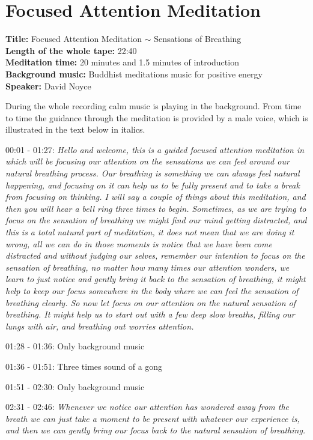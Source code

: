 \chapter{Focused Attention Meditation}
\textbf{Title:} Focused Attention Meditation $\sim$  Sensations of Breathing  \\
\textbf{Length of the whole tape:} 22:40 \\
\textbf{Meditation time:} 20 minutes and 1.5 minutes of introduction \\
\textbf{Background music:} Buddhist meditations music for positive energy  \\
\textbf{Speaker:} David Noyce 

During the whole recording calm music is playing in the background. From time to time the guidance through the meditation is provided by a male voice, which is illustrated in the text below in italics. 

00:01 - 01:27: \textit{Hello and welcome, this is a guided focused attention meditation in which will be focusing our attention on the sensations we can feel around our natural breathing process. Our breathing is something we can always feel natural happening, and focusing on it can help us to be fully present and to take a break from focusing on thinking. I will say a couple of things about this meditation, and then you will hear a bell ring three times to begin. Sometimes, as we are trying to focus on the sensation of breathing we might find our mind getting distracted, and this is a total natural part of meditation, it does not mean that we are doing it wrong, all we can do in those moments is notice that we have been come distracted and without judging our selves, remember our intention to focus on the sensation of breathing, no matter how many times our attention wonders, we learn to just notice and gently bring it back to the sensation of breathing, it might help to keep our focus somewhere in the body where we can feel the sensation of breathing clearly. So now let focus on our attention on the natural sensation of breathing. It might help us to start out with a few deep slow breaths, filling our lungs with air, and breathing out worries attention.}

01:28 - 01:36: Only background music 

01:36 - 01:51: Three times sound of a gong 

01:51 - 02:30: Only background music

02:31 - 02:46: \textit{Whenever we notice our attention has wondered away from the breath we can just take a moment to be present with whatever our experience is, and then we can gently bring our focus back to the natural sensation of breathing. }

